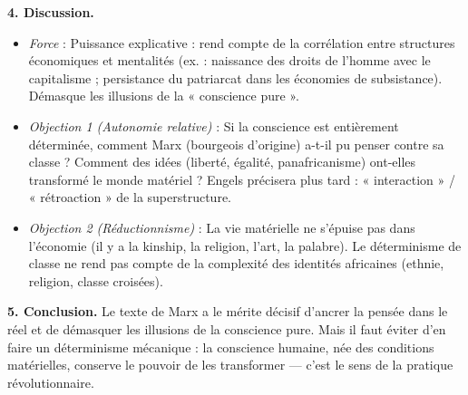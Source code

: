 \documentclass[11pt]{article}
\newcommand{\cle}[1]{{\popxbold\color{popdark}#1}}
\begin{document}
\begin{exoresolu}
\textbf{4. Discussion.}
\begin{itemize}
\item \emph{Force} : Puissance explicative : rend compte de la corrélation entre structures économiques et mentalités (ex. : naissance des droits de l'homme avec le capitalisme ; persistance du patriarcat dans les économies de subsistance). Démasque les illusions de la « conscience pure ».
\item \emph{Objection 1 (Autonomie relative)} : Si la conscience est entièrement déterminée, comment Marx (bourgeois d'origine) a-t-il pu penser contre sa classe ? Comment des idées (liberté, égalité, panafricanisme) ont-elles transformé le monde matériel ? Engels précisera plus tard : « interaction » / « rétroaction » de la superstructure.
\item \emph{Objection 2 (Réductionnisme)} : La vie matérielle ne s'épuise pas dans l'économie (il y a la kinship, la religion, l'art, la palabre). Le déterminisme de classe ne rend pas compte de la complexité des identités africaines (ethnie, religion, classe croisées).
\end{itemize}

\textbf{5. Conclusion.} Le texte de Marx a le mérite décisif d'ancrer la pensée dans le réel et de démasquer les illusions de la conscience pure. Mais il faut éviter d'en faire un déterminisme mécanique : la conscience humaine, née des conditions matérielles, conserve le pouvoir de les transformer — c'est le sens de la \cle{pratique révolutionnaire}.
\end{exoresolu}
\end{document}
